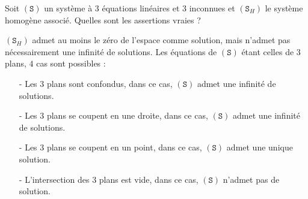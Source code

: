 \begin{question}
Soit $(\mathtt{S})$ un système à $3$ équations linéaires et $3$ inconnues et $(\mathtt{S}_H)$ le système homogène associé. Quelles sont les assertions vraies ?
\begin{answers}  
\end{answers}
\begin{explanations}
$(\mathtt{S}_H)$ admet au moins le zéro de l'espace comme solution, mais n'admet pas nécessairement une infinité de solutions. Les équations de $(\mathtt{S})$ étant celles de $3$ plans, $4$ cas sont possibles :
\begin{enumerate}
\item[-] Les $3$ plans sont confondus, dans ce cas, $(\mathtt{S})$ admet une infinité de solutions.
\item[-] Les $3$ plans se coupent en une droite, dans ce cas, $(\mathtt{S})$ admet une infinité de solutions.
\item[-] Les $3$ plans se coupent en un point, dans ce cas, $(\mathtt{S})$ admet une unique solution.
\item[-] L'intersection des  $3$ plans est vide, dans ce cas, $(\mathtt{S})$ n'admet pas de solution.
\end{enumerate}
\end{explanations}
\end{question}


